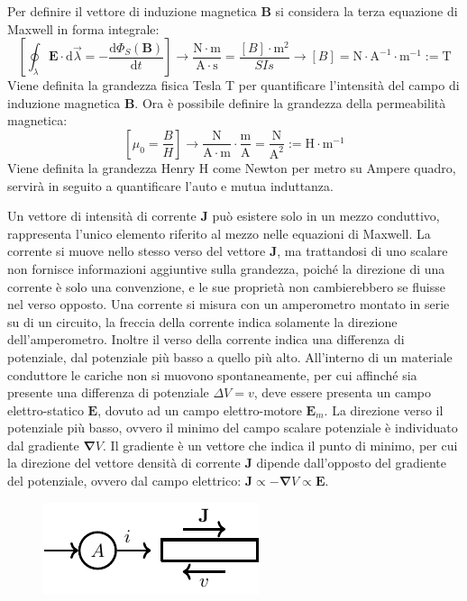 \documentclass{article}
\newcommand{\vect}[1]{\boldsymbol{\mathbf{#1}}}
\newcommand{\df}{\mathrm{d}}
\newcommand{\SI}[1]{\mathrm{#1}}
\numberwithin{equation}{subsection}
\begin{document}
Per definire il vettore di induzione magnetica $\vect{B}$ si considera la terza equazione di Maxwell in forma integrale:
\begin{equation*}
    \displaystyle\left[\oint_{\lambda}\vect{E}\cdot \df\vec\lambda=-\frac{\df\Phi_S(\vect{B})}{\df t}\right]\to\frac{\SI{N}\cdot \SI{m}}{\SI{A}\cdot \SI{s}}=\frac{[B]\cdot \SI{m}^2}{SI{s}}\to[B]=\SI{N}\cdot\SI{A}^{-1}\cdot\SI{m}^{-1}:=\SI{T}
\end{equation*}
Viene definita la grandezza fisica Tesla T per quantificare l'intensità del campo di induzione magnetica $\vect{B}$. Ora è possibile definire la grandezza della permeabilità 
magnetica:
\begin{equation*}
    \displaystyle\left[\mu_0=\frac{{B}}{{H}}\right]\to\frac{\SI{N}}{\SI{A}\cdot \SI{m}}\cdot\frac{\SI{m}}{\SI{A}}=\frac{\SI{N}}{\SI{A}^2}:=\SI{H}\cdot\SI{m}^{-1}
\end{equation*}
Viene definita la grandezza Henry H come Newton per metro su Ampere quadro, servirà in seguito a quantificare l'auto e mutua induttanza. 

Un vettore di intensità di corrente $\vect{J}$ può esistere solo in un mezzo conduttivo, rappresenta l'unico elemento riferito al mezzo nelle equazioni di Maxwell. La corrente 
si muove nello stesso verso del vettore $\vect{J}$, ma trattandosi di uno scalare non fornisce informazioni aggiuntive sulla grandezza, poiché la direzione di una corrente è 
solo una convenzione, e le sue proprietà non cambierebbero se fluisse nel verso opposto. Una corrente si misura con un amperometro montato in serie su di un circuito, la freccia 
della corrente indica solamente la direzione dell'amperometro. Inoltre il verso della corrente indica una differenza di potenziale, dal potenziale più basso a quello 
più alto. All'interno di un materiale conduttore le cariche non si muovono spontaneamente, per cui affinché sia presente una differenza di potenziale $\Delta V=v$, deve essere 
presenta un campo elettro-statico $\vect{E}$, dovuto ad un campo elettro-motore $\vect{E}_m$. La direzione verso il potenziale più basso, ovvero il minimo del campo scalare 
potenziale è individuato dal gradiente $\vect\nabla V$. Il gradiente è un vettore che indica il punto di minimo, per cui la direzione del vettore densità di corrente $\vect{J}$ 
dipende dall'opposto del gradiente del potenziale, ovvero dal campo elettrico: $\vect{J}\propto-\vect\nabla V\propto\vect{E}$. 

\begin{figure}[H]%
    \centering
    \includegraphics{amperometro.pdf}%
    \label{fig:amperometro}
\end{figure}
\end{document}
